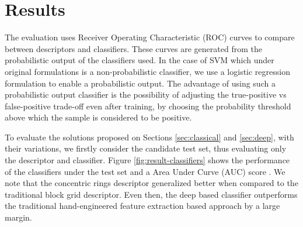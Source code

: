 \begin{figure*}[!t]
\centering
{}%
\hfil
{}%

%
\hfil
{}%

%
\hfil
{}%
\caption{Dataset examples. Images in first column are RGB and on the right are corresponding depth images. The bounding boxes in the images are obtained by the candidate detection algorithm.}
\label{fig:dataset}
\end{figure*}


\section{Results}
\label{sec:results}

    The evaluation uses Receiver Operating Characteristic (ROC) curves \cite{evaluationMetrics} to compare between descriptors and classifiers. These curves are generated from the probabilistic output of the classifiers used. In the case of SVM which under original formulations is a non-probabilistic classifier, we use a logistic regression formulation \cite{svmProbabilisticOutput} to enable a probabilistic output. The advantage of using such a probabilistic output classifier is the possibility of adjusting the true-positive vs false-positive trade-off even after training, by choosing the probability threshold above which the sample is considered to be positive.

    To evaluate the solutions proposed on Sections \ref{sec:classical} and \ref{sec:deep}, with their variations, we firstly consider the candidate test set, thus evaluating only the descriptor and classifier. Figure \ref{fig:result-classifiers} shows the performance of the classifiers under the test set and a Area Under Curve (AUC) score \cite{evaluationMetrics}. We note that the concentric rings descriptor generalized better when compared to the traditional block grid descriptor. Even then, the deep based classifier outperforms the traditional hand-engineered feature extraction based approach by a large margin.


    \begin{figure*}[!t]
    \centering
    \label{fig:result-classifiers-all}
    \hfil
    \caption{Classifiers performance. The AUC score for each classifier was, respectively, 0.9810, 0.7019 and 0.8745.}
    \label{fig:result-classifiers}
    \end{figure*}


